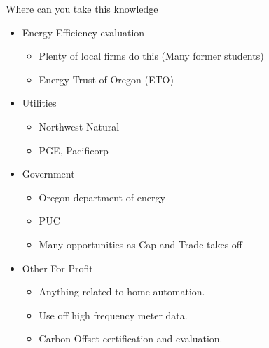 \documentclass[
  ignorenonframetext,
]{beamer}
\providecommand{\tightlist}{%
  \setlength{\itemsep}{0pt}\setlength{\parskip}{0pt}}
\begin{document}
\begin{frame}{Where can you take this knowledge}
\protect\hypertarget{where-can-you-take-this-knowledge}{}

\begin{itemize}
\tightlist
\item
  Energy Efficiency evaluation

  \begin{itemize}
  \tightlist
  \item
    Plenty of local firms do this (Many former students)
  \item
    Energy Trust of Oregon (ETO)
  \end{itemize}
\item
  Utilities

  \begin{itemize}
  \tightlist
  \item
    Northwest Natural
  \item
    PGE, Pacificorp
  \end{itemize}
\item
  Government

  \begin{itemize}
  \tightlist
  \item
    Oregon department of energy
  \item
    PUC
  \item
    Many opportunities as Cap and Trade takes off
  \end{itemize}
\item
  Other For Profit

  \begin{itemize}
  \tightlist
  \item
    Anything related to home automation.
  \item
    Use off high frequency meter data.
  \item
    Carbon Offset certification and evaluation.
  \end{itemize}
\end{itemize}

\end{frame}
\end{document}
